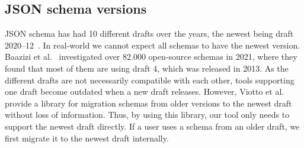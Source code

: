 

\subsection{JSON schema versions}\label{subsec:json-schema-versions}

JSON schema has had 10 different drafts over the years, the newest being draft 2020--12~\cite{jsonschemaJSONSchema}.
In real-world we cannot expect all schemas to have the newest version.
Baazizi et al.~\cite{baazizi2021empirical} investigated over 82.000 open-source schemas in 2021, where they found that most of them are using draft 4, which was released in 2013.
As the different drafts are not necessarily compatible with each other, tools supporting one draft become outdated when a new draft releases.
However, Viotto et al.~\cite{Viotti_Lagoni_2023} provide a library for migration schemas from older versions to the newest draft without loss of information.
Thus, by using this library, our tool only needs to support the newest draft directly.
If a user uses a schema from an older draft, we first migrate it to the newest draft internally.
